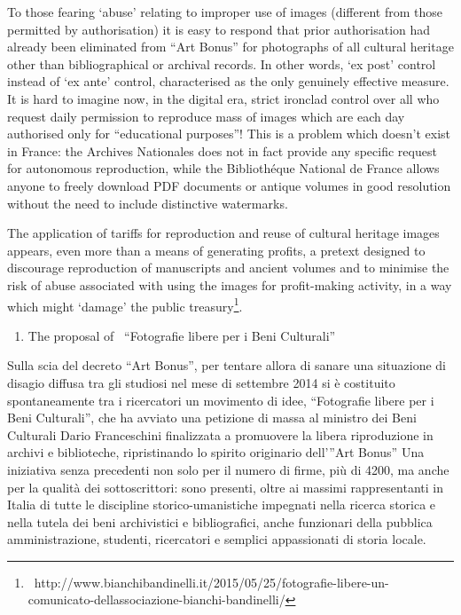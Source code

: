 \documentclass[amsthm,ebook]{saparticle}
\begin{document}
To those fearing ‘abuse’ relating to improper use of images (different from those permitted by authorisation) it is easy
to respond that prior authorisation had already been eliminated from “Art Bonus” for photographs of all cultural
heritage other than bibliographical or archival records. In other words, ‘ex post’ control instead of ‘ex ante’
control, characterised as the only genuinely effective measure. It is hard to imagine now, in the digital era, strict
ironclad control over all who request daily permission to reproduce mass of images which are each day authorised only
for “educational purposes”! This is a problem which doesn’t exist in France: the Archives Nationales does not in fact
provide any specific request for autonomous reproduction, while the Bibliothéque National de France allows anyone to
freely download PDF documents or antique volumes in good resolution without the need to include distinctive watermarks.

The application of tariffs for reproduction and reuse of cultural heritage images appears, even more than a means of
generating profits, a pretext designed to discourage reproduction of manuscripts and ancient volumes and to minimise
the risk of abuse associated with using the images for profit-making activity, in a way which might ‘damage’ the public
treasury\footnote{\ http://www.bianchibandinelli.it/2015/05/25/fotografie-libere-un-comunicato-dellassociazione-bianchi-bandinelli/}.







\begin{enumerate}
\item The proposal of \ “Fotografie libere per i Beni Culturali”
\end{enumerate}
Sulla scia del decreto “Art Bonus”, per tentare allora di sanare una situazione di disagio diffusa tra gli studiosi nel
mese di settembre 2014 si è costituito spontaneamente tra i ricercatori un movimento di idee, “Fotografie libere per i
Beni Culturali”, che ha avviato una petizione di massa al ministro dei Beni Culturali Dario Franceschini finalizzata a
promuovere la libera riproduzione in archivi e biblioteche, ripristinando lo spirito originario dell’”Art Bonus” Una
iniziativa senza precedenti non solo per il numero di firme, più di 4200, ma anche per la qualità dei sottoscrittori:
sono presenti, oltre ai massimi rappresentanti in Italia di tutte le discipline storico-umanistiche impegnati nella
ricerca storica e nella tutela dei beni archivistici e bibliografici, anche funzionari della pubblica amministrazione,
studenti, ricercatori e semplici appassionati di storia locale. 
\end{document}
